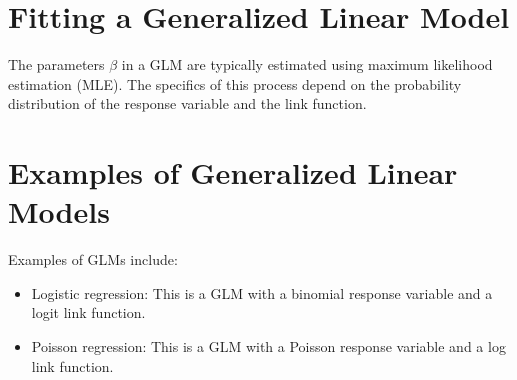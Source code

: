 \section{Fitting a Generalized Linear Model}

The parameters $\beta$ in a GLM are typically estimated using maximum likelihood estimation (MLE). The specifics of this process depend on the probability distribution of the response variable and the link function.

\section{Examples of Generalized Linear Models}

Examples of GLMs include:

\begin{itemize}
    \item Logistic regression: This is a GLM with a binomial response variable and a logit link function.
    \item Poisson regression: This is a GLM with a Poisson response variable and a log link function.
\end{itemize}
